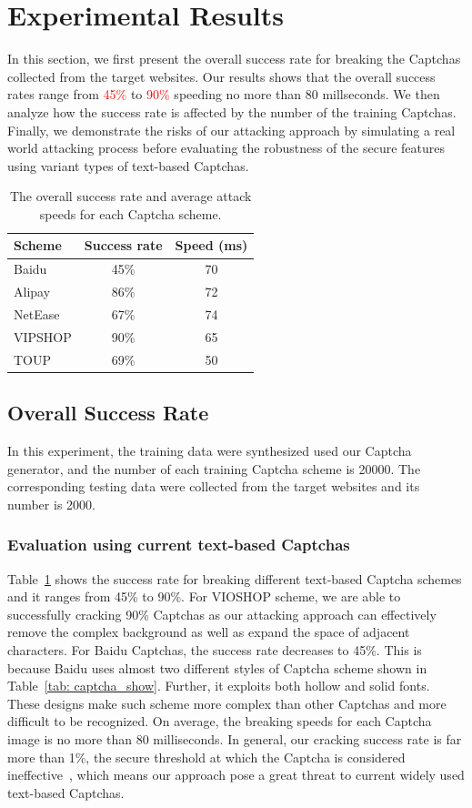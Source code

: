 \section{Experimental Results}
In this section, we first present the overall success rate for breaking the Captchas collected from the target websites. Our results shows that the overall success rates range from \textcolor{red}{45\%} to \textcolor{red}{90\%} speeding no more than 80 millseconds.
We then analyze how the success rate is affected by the number of the training Captchas.
Finally, we demonstrate the risks of our attacking approach by simulating a real world attacking process before evaluating the robustness of the secure features using variant types of text-based Captchas.

\begin{table}[t]
    \centering
    \caption{The overall success rate and average attack speeds for each Captcha scheme.}
    \label{table: overall_rate}
    \begin{tabular}{lcc}
        \toprule
        Scheme & Success rate  & Speed (ms)\\
        \midrule
        Baidu & 45\% & 70 \\
        Alipay & 86\% & 72 \\
        NetEase & 67\% & 74 \\
        VIPSHOP & 90\% & 65 \\
        TOUP & 69\% & 50 \\
        \bottomrule
    \end{tabular}
\end{table}

\subsection{Overall Success Rate}
In this experiment, the training data were synthesized used our Captcha generator, and the number of each training Captcha scheme is 20000. The corresponding testing data were collected from the target websites and its number is 2000.
\subsubsection{Evaluation using current text-based Captchas}
Table~\ref{table: overall_rate} shows the success rate for breaking different text-based Captcha schemes and it ranges from 45\% to 90\%. For VIOSHOP scheme, we are able to successfully cracking 90\% Captchas as our attacking approach can effectively remove the complex background as well as expand the space of adjacent characters. For Baidu Captchas, the success rate decreases to 45\%. This is because Baidu uses almost two different styles of Captcha scheme shown in Table~\ref{tab: captcha_show}. Further, it exploits both hollow and solid fonts. These designs make such scheme more complex than other Captchas and more difficult to be recognized.
On average, the breaking speeds for each Captcha image is no more than 80 milliseconds.
In general, our cracking success rate is far more than 1\%, the secure threshold at which the Captcha is considered ineffective~\cite{Bursztein2011Text}, which means our approach pose a great threat to current widely used text-based Captchas.

